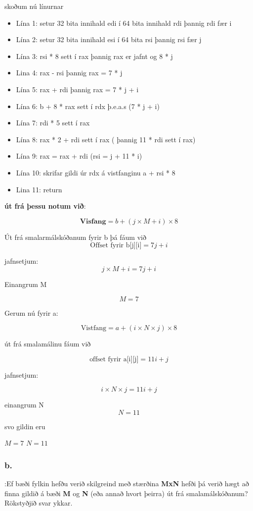 \documentclass{article}
\begin{document}
skoðum nú línurnar
\begin{itemize}
    \item Lína 1: setur 32 bita innihald edi í 64 bita innihald rdi þannig rdi fær i
    \item Lína 2: setur 32 bita innihald esi í 64 bita rsi þannig rsi fær j
    \item Lína 3: rsi * 8 sett í rax þannig rax er jafnt og 8 * j
    \item Lina 4: rax - rsi þannig rax = 7 * j
    \item Lína 5: rax + rdi þannig rax = 7 * j + i
    \item Lína 6: b + 8 * rax sett í rdx þ.e.a.s (7 * j + i)
    \item Lína 7: rdi * 5 sett í rax
    \item Lína 8: rax * 2 + rdi sett í rax ( þannig 11 * rdi sett í rax)
    \item Lína 9: rax = rax + rdi (rsi = j + 11 * i)
    \item Lína 10: skrifar gildi úr rdx á vistfanginu a + rsi * 8
    \item Lina 11: return
\end{itemize}

\textbf{út frá þessu notum við}:


\[\textbf{Visfang} = b + ( j \times M + i) \times 8\]

Út frá smalarmálskóðanum fyrir b þá fáum við
\[ \text{Offset fyrir b[j][i]} = 7j + i\]

jafnsetjum:
\[j \times M + i = 7j + i\]

Einangrum M

\[M = 7\]

Gerum nú fyrir a:

\[ \text{Vistfang} = a  + (i \times N \times j) \times 8\]

út frá smalamálinu fáum við

\[ \text{offset fyrir a[i][j]} = 11i +j\]

jafnsetjum:

\[ i \times N \times j = 11i +j\]

einangrum N
\[ N = 11\]

svo gildin eru 

$M = 7$
$N = 11$




\subsubsection{b.}:Ef bæði fylkin hefðu verið skilgreind með stærðina \textbf{MxN} hefði þá verið hægt að
finna gildið á bæði \textbf{M} og \textbf{N} (eða annað hvort þeirra) út frá smalamálskóðanum?
Rökstyðjið svar ykkar.
\end{document}
